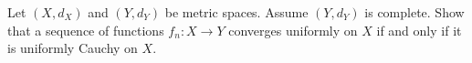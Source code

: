 \begin{problem}
  Let $(X, d_X)$ and $(Y, d_Y)$ be metric spaces.
  Assume $(Y, d_Y)$ is complete.
  Show that a sequence of functions $f_n : X \to Y$ converges uniformly
  on $X$ if and only if it is uniformly Cauchy on $X$.
\end{problem}

\begin{answer}

\end{answer}
